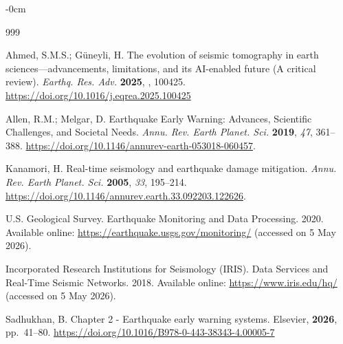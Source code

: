 \documentclass[data,article,accept,pdftex,moreauthors]{Definitions/mdpi}
\begin{document}
\begin{adjustwidth}{-\extralength}{0cm}

\begin{thebibliography}{999}

Ahmed, S.M.S.; G{\"u}neyli, H. The evolution of seismic tomography in earth sciences---advancements, limitations, and its AI-enabled future (A critical review). \emph{Earthq. Res. Adv.} \textbf{2025}, \emph{}, 100425. \url{https://doi.org/10.1016/j.eqrea.2025.100425} %

Allen, R.M.; Melgar, D. Earthquake Early Warning: Advances, Scientific Challenges, and Societal Needs. \emph{Annu. Rev. Earth Planet. Sci.} \textbf{2019}, \emph{47}, 361--388. \url{https://doi.org/10.1146/annurev-earth-053018-060457}. %

Kanamori, H. Real-time seismology and earthquake damage mitigation. \emph{Annu. Rev. Earth Planet. Sci.} \textbf{2005}, \emph{33}, 195--214. \url{https://doi.org/10.1146/annurev.earth.33.092203.122626}.

U.S. Geological Survey. Earthquake Monitoring and Data Processing. 2020. Available online: \url{https://earthquake.usgs.gov/monitoring/} (accessed on 5 May 2026).

Incorporated Research Institutions for Seismology (IRIS). Data Services and Real-Time Seismic Networks. 2018. Available online: \url{https://www.iris.edu/hq/} %
 (accessed on 5 May 2026).

Sadhukhan, B. Chapter 2 - Earthquake early warning systems. Elsevier, \textbf{2026}, pp.~41--80. \url{https://doi.org/10.1016/B978-0-443-38343-4.00005-7}


\end{thebibliography}
\end{adjustwidth}
\end{document}
